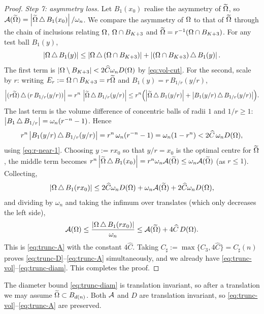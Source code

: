\begin{proof}
\smallskip
\emph{Step 7: asymmetry loss.}
Let $B_1(x_0)$ realise the asymmetry of $\widetilde{\Omega}$, so
$\mathcal{A}(\widetilde{\Omega})=\left|\widetilde{\Omega}\,\triangle\,B_1(x_0)\right|/\omega_n$. We compare the
asymmetry of $\Omega$ to that of $\widetilde{\Omega}$ through the chain of inclusions
relating $\Omega$, $\Omega\cap B_{K+3}$ and $\widetilde{\Omega}=r^{-1}(\Omega\cap B_{K+3})$.
For any test ball $B_1(y)$,
\[
   \left|\Omega\,\triangle\,B_1(y)\right|
   \le\left|\Omega\,\triangle\,(\Omega\cap B_{K+3})\right|
     +\left|(\Omega\cap B_{K+3})\,\triangle\,B_1(y)\right|.
\]
The first term is $\left|\Omega\setminus B_{K+3}\right|<2\widehat C\omega_n D(\Omega)$
by \eqref{eq:vol-cut}. For the second, scale by $r$: writing
$E_r:=\Omega\cap B_{K+3}=r\widetilde{\Omega}$ and $B_1(y)=r\,B_{1/r}(y/r)$,
\[
   \left|(r\widetilde{\Omega})\,\triangle\,(r\,B_{1/r}(y/r))\right|
   =r^n\,\left|\widetilde{\Omega}\,\triangle\,B_{1/r}(y/r)\right|
   \le r^n\Bigl(\left|\widetilde{\Omega}\,\triangle\,B_1(y/r)\right|
              +\left|B_1(y/r)\,\triangle\,B_{1/r}(y/r)\right|\Bigr).
\]
The last term is the volume difference of concentric balls of radii $1$
and $1/r\ge1$:
$\left|B_1\,\triangle\,B_{1/r}\right|=\omega_n(r^{-n}-1)$. Hence
\[
   r^n\left|B_1(y/r)\,\triangle\,B_{1/r}(y/r)\right|
   =r^n\,\omega_n(r^{-n}-1)=\omega_n(1-r^n)
   <2\widehat C\,\omega_n D(\Omega),
\]
using \eqref{eq:r-near-1}. Choosing $y:=r x_0$ so that $y/r=x_0$ is the
optimal centre for $\widetilde{\Omega}$, the middle term becomes
$r^n\left|\widetilde{\Omega}\,\triangle\,B_1(x_0)\right|=r^n\omega_n\mathcal{A}(\widetilde{\Omega})
\le\omega_n\mathcal{A}(\widetilde{\Omega})$ (as $r\le1$). Collecting,
\[
   \left|\Omega\,\triangle\,B_1(rx_0)\right|
   \le2\widehat C\omega_n D(\Omega)+\omega_n\mathcal{A}(\widetilde{\Omega})+2\widehat C\omega_n D(\Omega),
\]
and dividing by $\omega_n$ and taking the infimum over translates (which
only decreases the left side),
\begin{equation}\label{eq:trunc-A-pre}
   \mathcal{A}(\Omega)\le\frac{\left|\Omega\,\triangle\,B_1(rx_0)\right|}{\omega_n}
   \le\mathcal{A}(\widetilde{\Omega})+4\widehat C\,D(\Omega).
\end{equation}
This is \eqref{eq:trunc-A} with the constant $4\widehat C$. Taking
$C_\sharp:=\max\{C_3,4\widehat C\}=C_\sharp(n)$ proves
\eqref{eq:trunc-D}--\eqref{eq:trunc-A} simultaneously, and we already have
\eqref{eq:trunc-vol}--\eqref{eq:trunc-diam}. This completes the proof.
\end{proof}

\begin{remark}\label{rem:translate}
The diameter bound \eqref{eq:trunc-diam} is translation invariant, so
after a translation we may assume $\widetilde{\Omega}\subset B_{d(n)}$. Both
$\mathcal{A}$ and $D$ are translation invariant, so
\eqref{eq:trunc-vol}--\eqref{eq:trunc-A} are preserved.
\end{remark}


